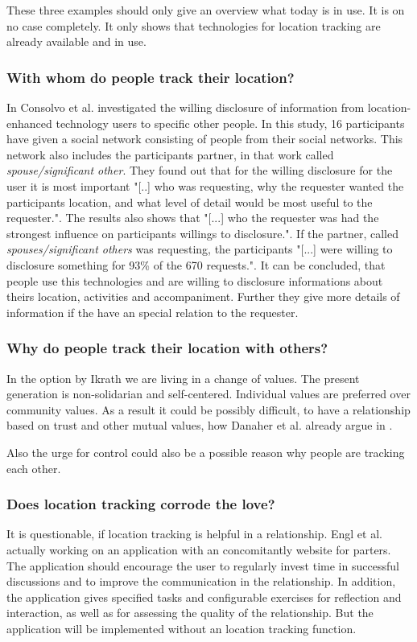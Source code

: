 These three examples should only give an overview what today is in use. It is on no case completely. It only shows that technologies for location tracking are already available and in use.

\subsubsection{With whom do people track their location?}
In \cite{Consolvo:2005:LDS:1054972.1054985} Consolvo et al. investigated the willing disclosure of information from location-enhanced technology users to specific other people. In this study, 16 participants have given a social network consisting of people from their social networks. This network also includes the participants partner, in that work called \textit{spouse/significant other}. They found out that for the willing disclosure for the user it is most important "[..] who was requesting, why the requester wanted the participants location, and what level of detail would be most useful to the requester.". The results also shows that "[...] who the requester was had the strongest influence on participants willings to disclosure.". If the partner, called \textit{spouses/significant others} was requesting, the participants "[...] were willing to disclosure something for 93\% of the 670 requests.".
It can be concluded, that people use this technologies and are willing to disclosure informations about theirs location, activities and accompaniment. Further they give more details of information if the have an special relation to the requester.

\subsubsection{Why do people track their location with others?}

In the option by Ikrath \cite{Ikrath2018} we are living in a change of values. The present generation is non-solidarian and self-centered. Individual values ​​are preferred over community values.
As a result it could be possibly difficult, to have a relationship based on trust and other mutual values, how Danaher et al. already argue in \cite{doi:10.1080/15265161.2017.1409823}.

Also the urge for control could also be a possible reason why people are tracking each other.

\subsubsection{Does location tracking corrode the love?}
It is questionable, if location tracking is helpful in a relationship.
Engl et al. \cite{engl2016} actually working on an application with an concomitantly website for parters.
The application should encourage the user to regularly invest time in successful discussions and to improve the communication in the relationship.
In addition, the application gives specified tasks and configurable exercises for reflection and interaction, as well as for assessing the quality of the relationship.
But the application will be implemented without an location tracking function.

